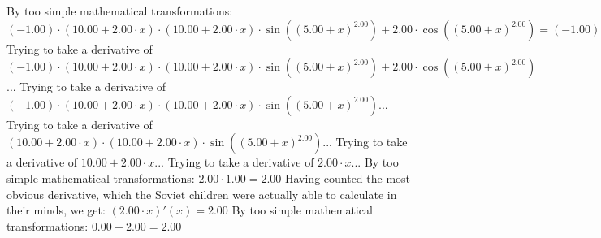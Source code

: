 \documentclass{article}
\begin{document}
\newline
By too simple mathematical transformations:
 ${{\left({-1.00}\right) \cdot {\left({{10.00} + {{2.00} \cdot {x}}}\right) \cdot {\left({{10.00} + {{2.00} \cdot {x}}}\right) \cdot  \sin {\left({\left({{5.00} + {x}}\right) ^ {2.00}}\right)} }}} + {{2.00} \cdot  \cos {\left({\left({{5.00} + {x}}\right) ^ {2.00}}\right)} }} = {{\left({-1.00}\right) \cdot {\left({{10.00} + {{2.00} \cdot {x}}}\right) \cdot {\left({{10.00} + {{2.00} \cdot {x}}}\right) \cdot  \sin {\left({\left({{5.00} + {x}}\right) ^ {2.00}}\right)} }}} + {{2.00} \cdot  \cos {\left({\left({{5.00} + {x}}\right) ^ {2.00}}\right)} }}$ 
 \newline
 \newline 
Trying to take a derivative of ${{\left({-1.00}\right) \cdot {\left({{10.00} + {{2.00} \cdot {x}}}\right) \cdot {\left({{10.00} + {{2.00} \cdot {x}}}\right) \cdot  \sin {\left({\left({{5.00} + {x}}\right) ^ {2.00}}\right)} }}} + {{2.00} \cdot  \cos {\left({\left({{5.00} + {x}}\right) ^ {2.00}}\right)} }}$...\newline
\newline
Trying to take a derivative of ${\left({-1.00}\right) \cdot {\left({{10.00} + {{2.00} \cdot {x}}}\right) \cdot {\left({{10.00} + {{2.00} \cdot {x}}}\right) \cdot  \sin {\left({\left({{5.00} + {x}}\right) ^ {2.00}}\right)} }}}$...\newline
\newline
Trying to take a derivative of ${\left({{10.00} + {{2.00} \cdot {x}}}\right) \cdot {\left({{10.00} + {{2.00} \cdot {x}}}\right) \cdot  \sin {\left({\left({{5.00} + {x}}\right) ^ {2.00}}\right)} }}$...\newline
\newline
Trying to take a derivative of ${{10.00} + {{2.00} \cdot {x}}}$...\newline
\newline
Trying to take a derivative of ${{2.00} \cdot {x}}$...\newline
\newline
By too simple mathematical transformations:
 ${{2.00} \cdot {1.00}} = {2.00}$ 
 \newline
 \newline 
Having counted the most obvious derivative, which the Soviet children were actually able to calculate in their minds, we get:
$({{2.00} \cdot {x}})'(x) = {2.00}$\newline
\newline
By too simple mathematical transformations:
 ${{0.00} + {2.00}} = {2.00}$ 
\end{document}
